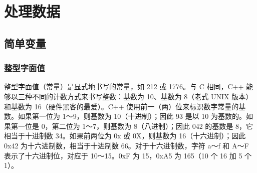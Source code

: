 \chapter{处理数据\label{ch02}}
\section{简单变量}
\subsection{整型字面值}
整型字面值（常量）是显式地书写的常量，如 212 或 1776。与 C 相同，C++ 能够以三种不同的计数方式来书写整数：基数为 10、基数为 8（老式 UNIX 版本）和基数为 16（硬件黑客的最爱）。C++ 使用前一（两）位来标识数字常量的基数。如果第一位为 1～9，则基数为 10（十进制）；因此 93 是以 10 为基数的。如果第一位是 0，第二位为 1～7，则基数为 8（八进制）；因此 042 的基数是 8，它相当于十进制数 34。如果前两位为 0x 或 0X，则基数为 16（十六进制）；因此 0x42 为十六进制数，相当于十进制数 66。对于十六进制数，字符 a～f 和 A～F 表示了十六进制位，对应于 10～15。0xF 为 15，0xA5 为 165（10 个 16 加 5 个 1）。
